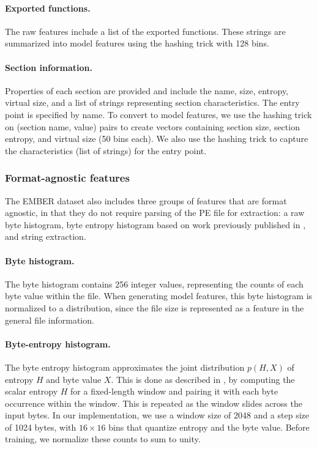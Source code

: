 \paragraph{Exported functions.}  The raw features include a list of the exported functions.  These strings are summarized into model features using the hashing trick with 128 bins.

\paragraph{Section information.} Properties of each section are provided and include the  name, size, entropy, virtual size, and a list of strings representing section characteristics.  The entry point is specified by name.  To convert to model features, we use the hashing trick on (section name, value) pairs to create vectors containing section size, section entropy, and virtual size (50 bins each). We also use the hashing trick to capture the characteristics (list of strings) for the entry point.

\subsubsection{Format-agnostic features}
The EMBER dataset also includes three groups of features that are format agnostic, in that they do not require parsing of the PE file for extraction: a raw byte histogram, byte entropy histogram based on work previously published in \cite{saxe2015deep}, and string extraction. 

\paragraph{Byte histogram.}  The byte histogram contains 256 integer values, representing the counts of each byte value within the file.  When generating model features, this byte histogram is normalized to a distribution, since the file size is represented as a feature in the general file information.

\paragraph{Byte-entropy histogram.} The byte entropy histogram approximates the joint distribution $p(H,X)$ of entropy $H$ and byte value $X$.  This is done as described in \cite{saxe2015deep}, by computing the scalar entropy $H$ for a fixed-length window and pairing it with each byte occurrence within the window.  This is repeated as the window slides across the input bytes. In our implementation, we use a window size of 2048 and a step size of 1024 bytes, with $16 \times 16$ bins that quantize entropy and the byte value.  Before training, we normalize these counts to sum to unity.


